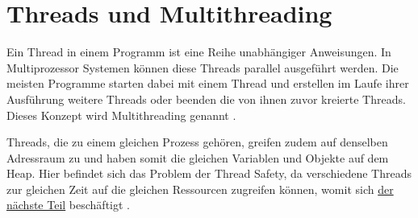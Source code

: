 \section{Threads und Multithreading}\label{sec:threads}

Ein Thread in einem Programm ist eine Reihe unabhängiger Anweisungen. In Multiprozessor Systemen können diese Threads parallel ausgeführt werden. Die meisten Programme starten dabei mit einem Thread und erstellen im Laufe ihrer Ausführung weitere Threads oder beenden die von ihnen zuvor kreierte Threads. Dieses Konzept wird Multithreading genannt \cite[vgl.][70]{banerjee_theory_2006}.

Threads, die zu einem gleichen Prozess gehören, greifen zudem auf denselben Adressraum zu und haben somit die gleichen Variablen und Objekte auf dem Heap. Hier befindet sich das Problem der Thread Safety, da verschiedene Threads zur gleichen Zeit auf die gleichen Ressourcen zugreifen können, womit sich \hyperref[sec:threadSafety]{der nächste Teil} beschäftigt \cite[vgl.][2]{brian}.